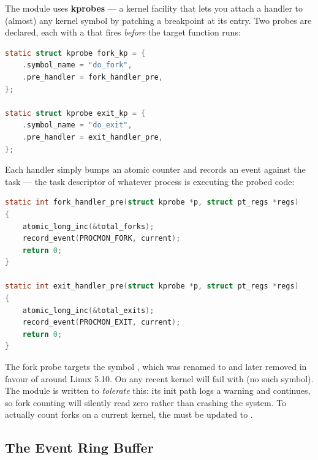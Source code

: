 The module uses \textbf{kprobes} — a kernel facility that lets you attach a
handler to (almost) any kernel symbol by patching a breakpoint at its entry. Two
probes are declared, each with a  that fires \emph{before} the
target function runs:

\begin{lstlisting}[language=C, caption={Kprobe definitions targeting fork and exit (aulinux\_procmon.c, lines 104--112)}]
static struct kprobe fork_kp = {
    .symbol_name = "do_fork",
    .pre_handler = fork_handler_pre,
};

static struct kprobe exit_kp = {
    .symbol_name = "do_exit",
    .pre_handler = exit_handler_pre,
};
\end{lstlisting}

Each handler simply bumps an atomic counter and records an event against the
 task — the task descriptor of whatever process is executing the
probed code:

\begin{lstlisting}[language=C, caption={Pre-handlers increment counters and log events (aulinux\_procmon.c, lines 86--101)}]
static int fork_handler_pre(struct kprobe *p, struct pt_regs *regs)
{
    atomic_long_inc(&total_forks);
    record_event(PROCMON_FORK, current);
    return 0;
}

static int exit_handler_pre(struct kprobe *p, struct pt_regs *regs)
{
    atomic_long_inc(&total_exits);
    record_event(PROCMON_EXIT, current);
    return 0;
}
\end{lstlisting}

\begin{warnbox}
The fork probe targets the symbol , which was renamed to
 and later removed in favour of  around
Linux 5.10. On any recent kernel  will fail
with  (no such symbol). The module is written to \emph{tolerate}
this: its init path logs a warning and continues, so fork counting will silently
read zero rather than crashing the system. To actually count forks on a current
kernel, the  must be updated to .
\end{warnbox}

\subsection{The Event Ring Buffer}

